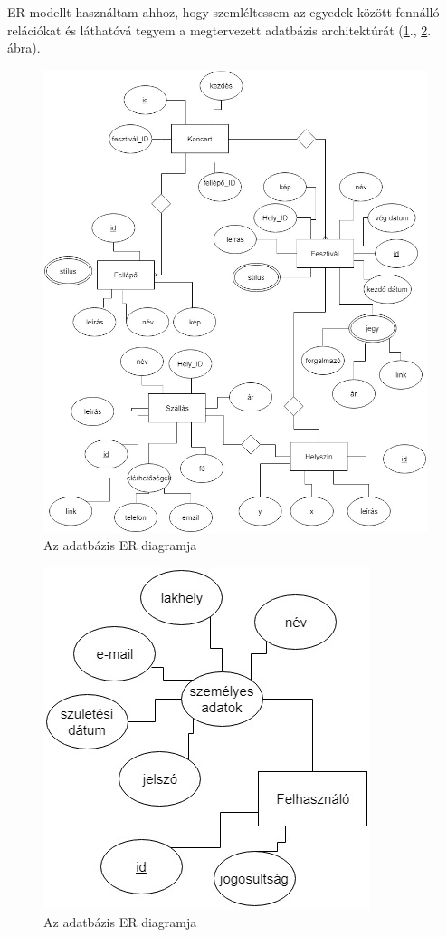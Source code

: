 

ER-modellt használtam ahhoz, hogy szemléltessem az egyedek között fennálló relációkat és láthatóvá tegyem a megtervezett adatbázis architektúrát (\ref{fig:er}., \ref{fig:usEr}. ábra).

\begin{figure}[h!]
\centering
\includegraphics[scale=0.5]{kepek/er.jpg}
\caption{Az adatbázis ER diagramja}
\label{fig:er}
\end{figure}

\begin{figure}[h!]
\centering
\includegraphics[scale=0.7]{kepek/userER.jpg}
\caption{Az adatbázis ER diagramja}
\label{fig:usEr}
\end{figure}

